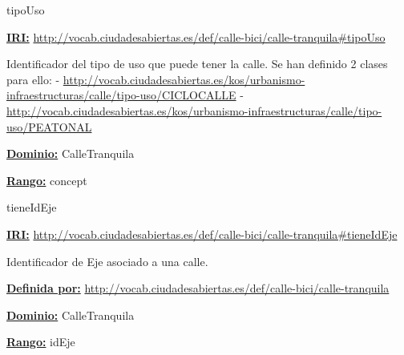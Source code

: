 \begin{mybox}{tipoUso}
\begin{flushleft}
\underline{\textbf{IRI:}}
\url{http://vocab.ciudadesabiertas.es/def/calle-bici/calle-tranquila#tipoUso}
\newline

Identificador del tipo de uso que puede tener la calle. Se han definido 2 clases para ello:
\newline -	\url{http://vocab.ciudadesabiertas.es/kos/urbanismo-infraestructuras/calle/tipo-uso/CICLOCALLE}
\newline -	 \url{http://vocab.ciudadesabiertas.es/kos/urbanismo-infraestructuras/calle/tipo-uso/PEATONAL}
\newline



\underline{\textbf{Dominio:}}
\newline CalleTranquila

\underline{\textbf{Rango:}}
		concept


\end{flushleft}
\end{mybox}



\begin{mybox}{tieneIdEje}
\begin{flushleft}
\underline{\textbf{IRI:}}
\url{http://vocab.ciudadesabiertas.es/def/calle-bici/calle-tranquila#tieneIdEje}
\newline

Identificador de Eje asociado a una calle.
\newline

\underline{\textbf{Definida por:}}
\url{http://vocab.ciudadesabiertas.es/def/calle-bici/calle-tranquila}
\newline

\underline{\textbf{Dominio:}}
		CalleTranquila
\newline

\underline{\textbf{Rango:}}
		idEje

\end{flushleft}
\end{mybox}





